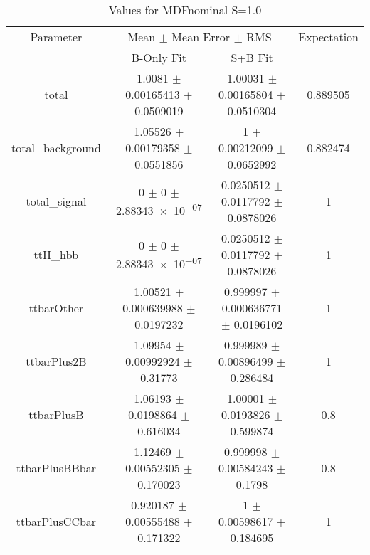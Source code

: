 \begin{table}
\centering
\caption{Values for MDFnominal S=1.0}
\begin{tabular}{cccc}
\toprule
Parameter & \multicolumn{2}{c}{Mean $\pm$ Mean Error $\pm$ RMS} & Expectation\\
 & B-Only Fit & S+B Fit & \\
\midrule
total & \num{1.0081} $\pm$ \num{0.00165413} $\pm$ \num{0.0509019} & \num{1.00031} $\pm$ \num{0.00165804} $\pm$ \num{0.0510304} & \num{0.889505}\\
total\_background & \num{1.05526} $\pm$ \num{0.00179358} $\pm$ \num{0.0551856} & \num{1} $\pm$ \num{0.00212099} $\pm$ \num{0.0652992} & \num{0.882474}\\
total\_signal & \num{0} $\pm$ \num{0} $\pm$ \num{2.88343e-07} & \num{0.0250512} $\pm$ \num{0.0117792} $\pm$ \num{0.0878026} & \num{1}\\
ttH\_hbb & \num{0} $\pm$ \num{0} $\pm$ \num{2.88343e-07} & \num{0.0250512} $\pm$ \num{0.0117792} $\pm$ \num{0.0878026} & \num{1}\\
ttbarOther & \num{1.00521} $\pm$ \num{0.000639988} $\pm$ \num{0.0197232} & \num{0.999997} $\pm$ \num{0.000636771} $\pm$ \num{0.0196102} & \num{1}\\
ttbarPlus2B & \num{1.09954} $\pm$ \num{0.00992924} $\pm$ \num{0.31773} & \num{0.999989} $\pm$ \num{0.00896499} $\pm$ \num{0.286484} & \num{1}\\
ttbarPlusB & \num{1.06193} $\pm$ \num{0.0198864} $\pm$ \num{0.616034} & \num{1.00001} $\pm$ \num{0.0193826} $\pm$ \num{0.599874} & \num{0.8}\\
ttbarPlusBBbar & \num{1.12469} $\pm$ \num{0.00552305} $\pm$ \num{0.170023} & \num{0.999998} $\pm$ \num{0.00584243} $\pm$ \num{0.1798} & \num{0.8}\\
ttbarPlusCCbar & \num{0.920187} $\pm$ \num{0.00555488} $\pm$ \num{0.171322} & \num{1} $\pm$ \num{0.00598617} $\pm$ \num{0.184695} & \num{1}\\
\bottomrule
\end{tabular}
\end{table}